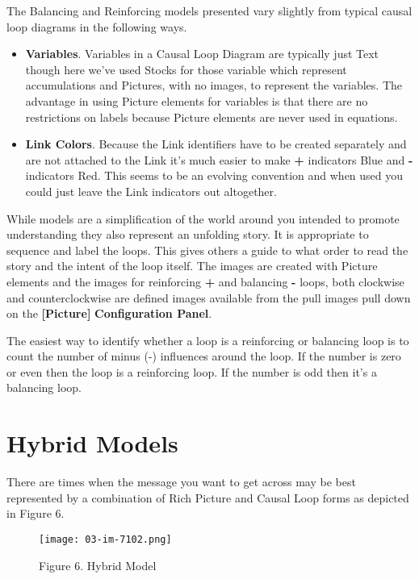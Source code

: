 \documentclass[]{memoir}
\let\Oldincludegraphics\includegraphics
\renewcommand{\includegraphics}[1]{\Oldincludegraphics[max size={\textwidth}{\textheight}]{#1}}
\newcommand{\p}[1]{\textbf{{[}#1{]}}}
\renewcommand{\u}[1]{\textbf{#1}}
\begin{document}
The Balancing and Reinforcing models presented vary slightly from
typical causal loop diagrams in the following ways.

\begin{itemize}
\itemsep1pt\parskip0pt
\item
  \textbf{Variables}. Variables in a Causal Loop Diagram are typically
  just Text though here we've used Stocks for those variable which
  represent accumulations and Pictures, with no images, to represent the
  variables. The advantage in using Picture elements for variables is
  that there are no restrictions on labels because Picture elements are
  never used in equations.
\item
  \textbf{Link Colors}. Because the Link identifiers have to be created
  separately and are not attached to the Link it's much easier to make
  \textbf{+} indicators Blue and \textbf{-} indicators Red. This seems
  to be an evolving convention and when used you could just leave the
  Link indicators out altogether.
\end{itemize}

While models are a simplification of the world around you intended to
promote understanding they also represent an unfolding story. It is
appropriate to sequence and label the loops. This gives others a guide
to what order to read the story and the intent of the loop itself. The
images are created with Picture elements and the images for reinforcing
\textbf{+} and balancing \textbf{-} loops, both clockwise and
counterclockwise are defined images available from the pull images pull
down on the \p{Picture} \u{Configuration Panel}.

The easiest way to identify whether a loop is a reinforcing or balancing
loop is to count the number of minus (-) influences around the loop. If
the number is zero or even then the loop is a reinforcing loop. If the
number is odd then it's a balancing loop.

\section{Hybrid Models}

There are times when the message you want to get across may be best
represented by a combination of Rich Picture and Causal Loop forms as
depicted in Figure 6.

\begin{figure}[htbp]
\centering
\texttt{[image: 03-im-7102.png]}
\caption{Figure 6. Hybrid Model}
\end{figure}
\end{document}
